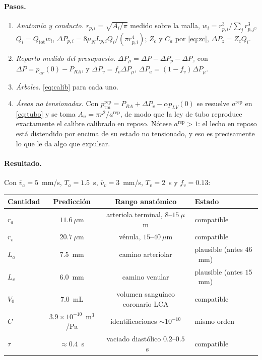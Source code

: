 \documentclass[11pt]{article}
\newcommand{\ptm}{p_{\mathrm{tm}}}
\begin{document}
\paragraph{Pasos.}
\begin{enumerate}
\item \emph{Anatom\'ia y conducto.} $r_{p,i}=\sqrt{A_i/\pi}$ medido sobre la
      malla, $w_i=r_{p,i}^{3}/\sum_j r_{p,j}^{3}$, $Q_i=Q_{\text{tot}}w_i$,
      $\Delta P_{p,i}=8\mu_N L_{p,i}Q_i/(\pi r_{p,i}^{4})$; $Z_c$ y $C_a$ por
      \eqref{eq:zc}, $\Delta P_{z}=Z_cQ_i$.
\item \emph{Reparto medido del presupuesto.}
      $\Delta P_\mu=\Delta P-\Delta P_p-\Delta P_z$ con
      $\Delta P=p_{ar}(0)-P_{RA}$, y
      $\Delta P_v=f_v\Delta P_\mu$, $\Delta P_a=(1-f_v)\Delta P_\mu$.
\item \emph{\'Arboles.} \eqref{eq:calib} para cada uno.
\item \emph{\'Areas no tensionadas.} Con
      $\ptm^{\text{rep}}=P_{RA}+\Delta P_v-\alpha p_{LV}(0)$ se resuelve
      $a^{\text{rep}}$ en \eqref{eq:tubo} y se toma
      $A_u=\pi r^{2}/a^{\text{rep}}$, de modo que la ley de tubo reproduce
      exactamente el calibre calibrado en reposo. N\'otese $a^{\text{rep}}>1$:
      el lecho en reposo est\'a distendido por encima de su estado no
      tensionado, y eso es precisamente lo que le da algo que expulsar.
\end{enumerate}

\paragraph{Resultado.} Con $\bar v_a=5$~mm/s, $T_a=1.5$~s, $\bar v_v=3$~mm/s,
$T_v=2$~s y $f_v=0.13$:
\begin{center}\small
\begin{tabular}{lccl}
\toprule
Cantidad & Predicci\'on & Rango anat\'omico & Estado\\
\midrule
$r_a$ & $11.6~\mu$m & arteriola terminal, $8$--$15~\mu$m & compatible\\
$r_v$ & $20.7~\mu$m & v\'enula, $15$--$40~\mu$m & compatible\\
$L_a$ & $7.5$~mm & camino arteriolar & plausible (antes $46$~mm)\\
$L_v$ & $6.0$~mm & camino venular & plausible (antes $15$~mm)\\
$V_0$ & $7.0$~mL & volumen sangu\'ineo coronario LCA & compatible\\
$C$   & $3.9\times10^{-10}$~m$^3$/Pa & identificaciones $\sim10^{-10}$ & mismo orden\\
$\tau$ & $\approx0.4$~s & vaciado diast\'olico $0.2$--$0.5$~s & compatible\\
\bottomrule
\end{tabular}
\end{center}
\end{document}
